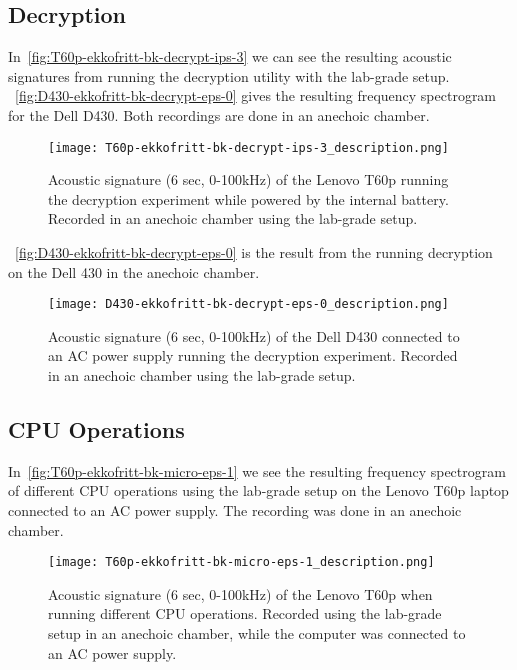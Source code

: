 \subsection{Decryption}\label{chp5:subsec:t60p_bk_results_decryption}
In~\autoref{fig:T60p-ekkofritt-bk-decrypt-ips-3} we can see the resulting acoustic signatures from running the decryption utility with the lab-grade setup.
~\autoref{fig:D430-ekkofritt-bk-decrypt-eps-0} gives the resulting frequency spectrogram for the Dell D430.
Both recordings are done in an anechoic chamber.

\begin{figure}[ht]
    \centering
    \texttt{[image: T60p-ekkofritt-bk-decrypt-ips-3\_description.png]}
    \caption{Acoustic signature (6 sec, 0-100kHz) of the Lenovo T60p running the decryption experiment while powered by the internal battery. 
    Recorded in an anechoic chamber using the lab-grade setup. }
    \label{fig:T60p-ekkofritt-bk-decrypt-ips-3}
\end{figure}


~\autoref{fig:D430-ekkofritt-bk-decrypt-eps-0} is the result from the running decryption on the Dell 430 in the anechoic chamber. 
\begin{figure}[ht]
    \centering
    \texttt{[image: D430-ekkofritt-bk-decrypt-eps-0\_description.png]}
    \caption{Acoustic signature (6 sec, 0-100kHz) of the Dell D430 connected to an AC power supply running the decryption experiment.
        Recorded in an anechoic chamber using the lab-grade setup.}
    \label{fig:D430-ekkofritt-bk-decrypt-eps-0}
\end{figure}



\subsection{CPU Operations}\label{chp5:subsec:t60p_bk_results_micro}
In~\autoref{fig:T60p-ekkofritt-bk-micro-eps-1} we see the resulting frequency spectrogram of different \gls{CPU} operations using the lab-grade setup on the Lenovo T60p laptop connected to an AC power supply.
The recording was done in an anechoic chamber.

\begin{figure}[ht]
    \centering
    \texttt{[image: T60p-ekkofritt-bk-micro-eps-1\_description.png]}
    \caption{Acoustic signature (6 sec, 0-100kHz) of the Lenovo T60p when running different \gls{CPU} operations.
        Recorded using the lab-grade setup in an anechoic chamber, while the computer was connected to an AC power supply.}
    \label{fig:T60p-ekkofritt-bk-micro-eps-1}
\end{figure}

